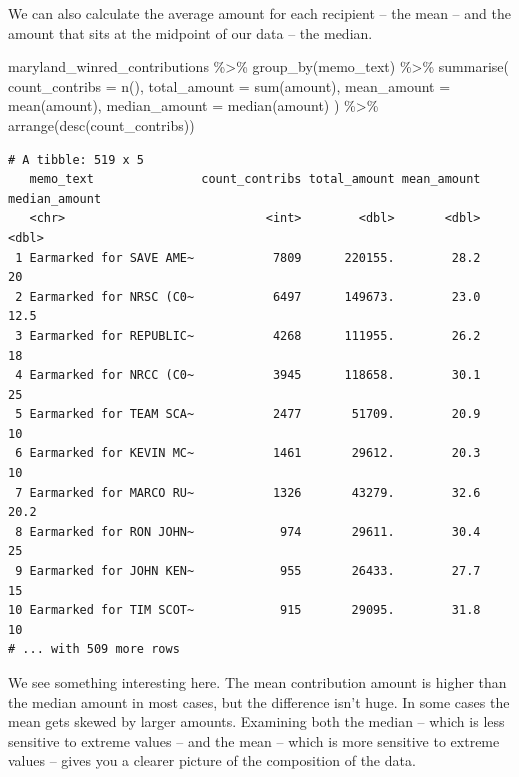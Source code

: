 \documentclass[
  letterpaper,
  DIV=11,
  numbers=noendperiod]{scrreprt}
\newenvironment{Shaded}{\begin{snugshade}}{\end{snugshade}}
\newcommand{\AttributeTok}[1]{\textcolor[rgb]{0.40,0.45,0.13}{#1}}
\newcommand{\FunctionTok}[1]{\textcolor[rgb]{0.28,0.35,0.67}{#1}}
\newcommand{\NormalTok}[1]{\textcolor[rgb]{0.00,0.23,0.31}{#1}}
\newcommand{\SpecialCharTok}[1]{\textcolor[rgb]{0.37,0.37,0.37}{#1}}
\begin{document}
We can also calculate the average amount for each recipient -- the mean
-- and the amount that sits at the midpoint of our data -- the median.

\begin{Shaded}
\begin{Highlighting}[]
\NormalTok{maryland\_winred\_contributions }\SpecialCharTok{\%\textgreater{}\%}
  \FunctionTok{group\_by}\NormalTok{(memo\_text) }\SpecialCharTok{\%\textgreater{}\%}
  \FunctionTok{summarise}\NormalTok{(}
    \AttributeTok{count\_contribs =} \FunctionTok{n}\NormalTok{(),}
    \AttributeTok{total\_amount =} \FunctionTok{sum}\NormalTok{(amount),}
    \AttributeTok{mean\_amount =} \FunctionTok{mean}\NormalTok{(amount),}
    \AttributeTok{median\_amount =} \FunctionTok{median}\NormalTok{(amount)}
\NormalTok{  ) }\SpecialCharTok{\%\textgreater{}\%}
  \FunctionTok{arrange}\NormalTok{(}\FunctionTok{desc}\NormalTok{(count\_contribs))}
\end{Highlighting}
\end{Shaded}

\begin{verbatim}
# A tibble: 519 x 5
   memo_text               count_contribs total_amount mean_amount median_amount
   <chr>                            <int>        <dbl>       <dbl>         <dbl>
 1 Earmarked for SAVE AME~           7809      220155.        28.2          20  
 2 Earmarked for NRSC (C0~           6497      149673.        23.0          12.5
 3 Earmarked for REPUBLIC~           4268      111955.        26.2          18  
 4 Earmarked for NRCC (C0~           3945      118658.        30.1          25  
 5 Earmarked for TEAM SCA~           2477       51709.        20.9          10  
 6 Earmarked for KEVIN MC~           1461       29612.        20.3          10  
 7 Earmarked for MARCO RU~           1326       43279.        32.6          20.2
 8 Earmarked for RON JOHN~            974       29611.        30.4          25  
 9 Earmarked for JOHN KEN~            955       26433.        27.7          15  
10 Earmarked for TIM SCOT~            915       29095.        31.8          10  
# ... with 509 more rows
\end{verbatim}

We see something interesting here. The mean contribution amount is
higher than the median amount in most cases, but the difference isn't
huge. In some cases the mean gets skewed by larger amounts. Examining
both the median -- which is less sensitive to extreme values -- and the
mean -- which is more sensitive to extreme values -- gives you a clearer
picture of the composition of the data.
\end{document}
